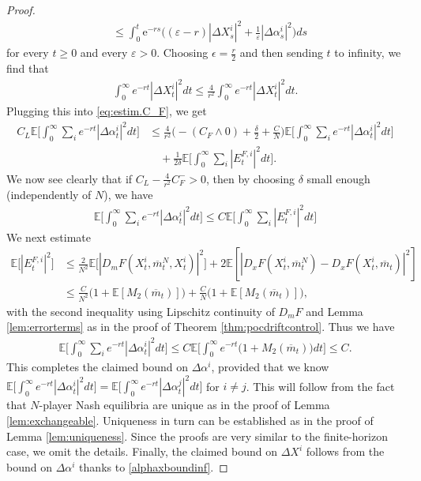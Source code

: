 \documentclass[11pt,reqno]{amsart}
\numberwithin{equation}{section}
\theoremstyle{definition}
\def\E{{\mathbb E}}
\newcommand{\ov}{\overline}
\def \E{\mathbb{E}}
\def \e{\mathrm{e}}
\begin{document}
\begin{proof}
\begin{align*}
    &\le \int_0^t\e^{-rs}\Big( (\varepsilon-r)|\Delta X^{i}_s|^2 + \frac{1}{\varepsilon}|\Delta \alpha^{i}_s|^2  \Big)ds \nonumber
\end{align*}
for every $t\ge0$ and every $\varepsilon>0$.
Choosing $\epsilon = \frac{r}{2}$ and then sending $t$ to infinity, we find that 
\begin{align} \label{alphaxboundinf}
    \int_0^{\infty} e^{-rt} |\Delta X_t^i|^2 dt \leq \frac{4}{r^2} \int_0^{\infty} e^{-rt} |\Delta X_t^i|^2 dt.
\end{align}
Plugging this into \eqref{eq:estim.C_F}, we get 
\begin{align*}
C_L \E \bigg[\int_0^{\infty} \sum_i e^{-rt} |\Delta \alpha_t^i|^2 dt \bigg] 
 &\leq  \frac{4}{r^2} \big(- (C_F \wedge 0) + \frac{\delta}{2} + \frac{C}{N} \big) \E\bigg[\int_0^{\infty}\sum_i  e^{-rt}  |\Delta \alpha_t^i|^2 dt \bigg]\\
 &\quad + \frac{1}{2 \delta} \E\bigg[\int_0^{\infty} \sum_i |E_t^{F,i}|^2 dt \bigg].
\end{align*}
We now see clearly that if $C_L - \frac{4}{r^2} C_F^- > 0$, then by choosing $\delta$ small enough (independently of $N$), we have 
\begin{align}
     \E\bigg[\int_0^{\infty} \sum_i e^{-rt} |\Delta \alpha_t^i|^2 dt \bigg] \leq C \E\bigg[\int_0^{\infty} \sum_i |E_t^{F,i}|^2 dt \bigg]
\end{align}
We next estimate 
\begin{align*}
  \E\big[ |E_t^{F,i}|^2 \big] &\leq \frac{2}{N^2} \E\big[|D_m F(X_t^i, \ov{m}_t^N, X_t^i)|^2\big] +2 \E[|D_x F(X_t^i, \ov{m}_t^N) - D_x F(X_t^i, \ov{m}_t)|^2] \\
  &\leq \frac{C}{N^2} \big(1 + \E[M_2(\ov{m}_t)]  \big)  + \frac{C}{N}\big(1 + \E[M_2(\ov{m}_t)]  \big), 
\end{align*}
with the second inequality using Lipschitz continuity of $D_m F$ and Lemma \ref{lem:errorterms} as in the proof of Theorem \ref{thm:pocdriftcontrol}. Thus we have 
\begin{align*}
  \E\bigg[\int_0^{\infty} \sum_i e^{-rt} |\Delta \alpha_t^i|^2 dt \bigg] \leq C \E\bigg[\int_0^{\infty}e^{-rt} \big( 1 + M_2(\ov{m}_t) \big) dt \bigg] \leq C. 
\end{align*}
This completes the claimed bound on $\Delta \alpha^i$, provided that we know $\E\Big[\int_0^{\infty}e^{-rt} |\Delta \alpha_t^i|^2 dt \Big] = \E\Big[\int_0^{\infty}e^{-rt} |\Delta \alpha_t^j|^2 dt  \Big]$ for $i \neq j$. This will follow from the fact that $N$-player Nash equilibria are unique as in the proof of Lemma \ref{lem:exchangeable}. Uniqueness in turn can be established as in the proof of Lemma \ref{lem:uniqueness}. Since the proofs are very similar to the finite-horizon case, we omit the details. Finally, the claimed bound on $\Delta X^i$ follows from the bound on $\Delta \alpha^i$ thanks to \eqref{alphaxboundinf}. 
  \end{proof}
\end{document}
